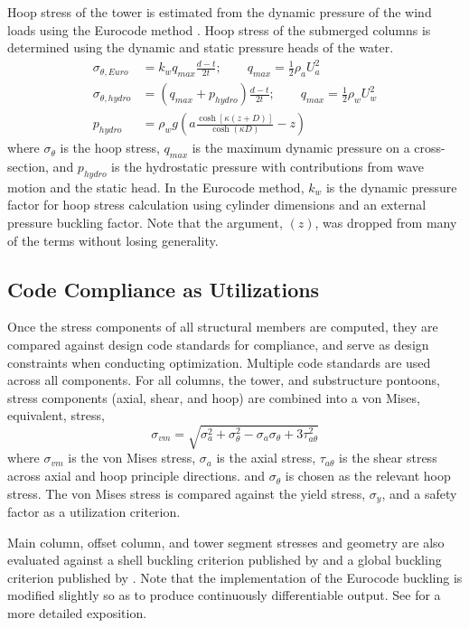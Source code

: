 Hoop stress of the tower is estimated from the dynamic pressure of the
wind loads using the Eurocode method \citep{Eurocode}.  Hoop stress of the submerged
columns is determined using the dynamic and static pressure heads of the
water.
\begin{align}
  \sigma_{\theta,Euro} &= k_w q_{max} \frac{d-t}{2t};\qquad q_{max} =
                         \frac{1}{2}\rho_a U_a^2\\
  \sigma_{\theta,hydro} &= \left(q_{max}+p_{hydro}\right) \frac{d-t}{2t};\qquad q_{max} =
                          \frac{1}{2}\rho_w U_w^2\\
  p_{hydro} &= \rho_w g \left( a\frac{\cosh\left[\kappa\left(z + D \right)\right]}{\cosh\left(\kappa D\right)} - z\right)
\end{align}
where $\sigma_{\theta}$ is the hoop stress, $q_{max}$ is the maximum
dynamic pressure on a cross-section, and $p_{hydro}$ is the hydrostatic
pressure with contributions from wave motion and the static head.  In
the Eurocode method, $k_w$ is the dynamic pressure factor for hoop
stress calculation using cylinder dimensions and an external pressure
buckling factor.  Note that the argument, $(z)$, was dropped from many
of the terms without losing generality.



\subsection{Code Compliance as Utilizations}
Once the stress components of all structural members are computed, they
are compared against design code standards for compliance, and serve as
design constraints when conducting optimization.  Multiple code
standards are used across all components.  For all columns, the tower,
and substructure pontoons, stress components (axial, shear, and hoop)
are combined into a von Mises, equivalent, stress,
\begin{equation}
  \sigma_{vm} = \sqrt{\sigma_a^2 + \sigma_{\theta}^2 -
    \sigma_a\sigma_{\theta} + 3\tau_{a\theta}^2}
\end{equation}
where $\sigma_{vm}$ is the von Mises stress, $\sigma_a$ is the axial
stress, $\tau_{a\theta}$ is the shear stress across axial and hoop
principle directions.  and $\sigma_{\theta}$ is chosen as the relevant
hoop stress.  The von Mises stress is compared against the yield stress,
$\sigma_y$, and a safety factor as a utilization criterion.

Main column, offset column, and tower segment stresses and geometry are
also evaluated against a shell buckling criterion published by
\citet{Eurocode} and a global buckling criterion published by
\citet{Germanischer}.  Note that the implementation of the Eurocode
buckling is modified slightly so as to produce continuously
differentiable output.  See \citet{JacketSE} for a more detailed
exposition.

